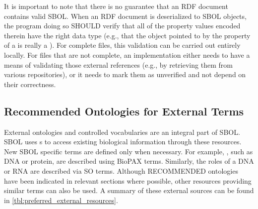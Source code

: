 It is important to note that there is no guarantee that an RDF document
contains valid SBOL. When an RDF document is deserialized to SBOL
objects, the program doing so SHOULD verify that all of the property
values encoded therein have the right data type (e.g., that the object
pointed to by the  property of a
 is really a ).
For complete files, this validation can be carried out entirely locally. For files that are not complete, an implementation either needs to
have a means of validating those external references (e.g., by
retrieving them from various repositories), or it needs to mark them as
unverified and not depend on their correctness.

\subsection{Recommended Ontologies for External Terms}
\label{sec:recomm_ontologies}

External ontologies and controlled vocabularies are an integral part of SBOL. SBOL uses s to access existing biological information through these resources. New SBOL specific terms are defined only when necessary. For example,  , such as DNA or protein, are described using BioPAX terms. Similarly, the roles of a DNA or RNA  are described via SO terms. Although RECOMMENDED ontologies have been indicated in relevant sections where possible, other resources providing similar terms can also be used. A summary of these external sources can be found in \ref{tbl:preferred_external_resources}.

